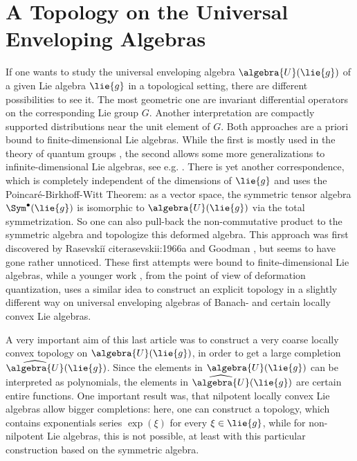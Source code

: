 \documentclass[
11pt,                          %
english                        %
]{article}
\begin{document}
\section{A Topology on the Universal Enveloping Algebras}
If one wants to study the universal enveloping algebra $\algebra{U}(\lie{g})$ of a 
given Lie algebra $\lie{g}$ in a topological setting, there are different 
possibilities to see it. The most geometric one are invariant differential operators 
on the corresponding Lie group $G$. Another interpretation are compactly supported 
distributions near the unit element of $G$. Both approaches are a priori bound to 
finite-dimensional Lie algebras. While the first is mostly used in the theory of 
quantum groups \cite{pflaum.schottenloher:1998a}, the second allows some more 
generalizations to infinite-dimensional Lie algebras, see e.g. 
\cite{beltita.nicolae:2015a}. There is yet another correspondence, which is 
completely independent of the dimensions of $\lie{g}$ and uses the 
Poincar\'e-Birkhoff-Witt Theorem: as a vector space, the symmetric tensor algebra 
$\Sym^{\bullet}(\lie{g})$ is isomorphic to $\algebra{U}(\lie{g})$ via the total 
symmetrization. So one can also pull-back the non-commutative product to the 
symmetric algebra and topologize this deformed algebra. This approach was first 
discovered by Rasevski{\u i} cite{rasevskii:1966a} and Goodman \cite{goodman:1971a}, 
but seems to have gone rather unnoticed. These first attempts were bound to 
finite-dimensional Lie algebras, while a younger work 
\cite{esposito.stapor.waldmann:2015a:pre}, from the point of view of deformation 
quantization, uses a similar idea to construct an explicit topology in a slightly 
different way on universal enveloping algebras of Banach- and certain locally convex 
Lie algebras.

A very important aim of this last article was to construct a very coarse locally 
convex topology on $\algebra{U}(\lie{g})$, in order to get a large completion 
$\widehat{\algebra{U}}(\lie{g})$. Since the elements in $\algebra{U}(\lie{g})$ can be 
interpreted as polynomials, the elements in $\widehat{\algebra{U}}(\lie{g})$ are 
certain entire functions. One important result was, that nilpotent locally convex Lie 
algebras allow bigger completions: here, one can construct a topology, which contains 
exponentials series $\exp(\xi)$ for every $\xi \in \lie{g}$, while for non-nilpotent 
Lie algebras, this is not possible, at least with this particular construction based 
on the symmetric algebra.
\end{document}

